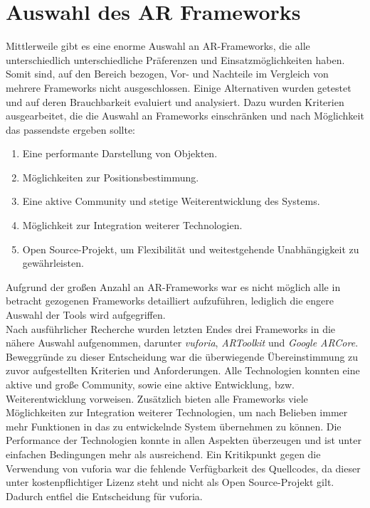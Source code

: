 \section{Auswahl des AR Frameworks}
\label{chap:Auswahl des AR Frameworks}
Mittlerweile gibt es eine enorme Auswahl an \acs{AR}-Frameworks, die alle unterschiedlich unterschiedliche Präferenzen und 
Einsatzmöglichkeiten haben. Somit sind, auf den Bereich bezogen, Vor- und Nachteile im Vergleich von mehrere Frameworks nicht ausgeschlossen. 
Einige Alternativen wurden getestet und auf deren Brauchbarkeit evaluiert und analysiert. Dazu wurden Kriterien ausgearbeitet, die die 
Auswahl an Frameworks einschränken und nach Möglichkeit das passendste ergeben sollte: 
\begin{enumerate}
    \item Eine performante Darstellung von Objekten.
    \item Möglichkeiten zur Positionsbestimmung.
    \item Eine aktive Community und stetige Weiterentwicklung des Systems.
    \item Möglichkeit zur Integration weiterer Technologien.
    \item Open Source-Projekt, um Flexibilität und weitestgehende Unabhängigkeit zu gewährleisten.
\end{enumerate}
Aufgrund der großen Anzahl an \acs{AR}-Frameworks war es nicht möglich alle in betracht gezogenen Frameworks detailliert aufzuführen, 
lediglich die engere Auswahl der Tools wird aufgegriffen. 
\\ 
Nach ausführlicher Recherche wurden letzten Endes drei Frameworks in die nähere Auswahl aufgenommen, darunter \textit{vuforia}, 
\textit{ARToolkit} und \textit{Google ARCore}. Beweggründe zu dieser Entscheidung war die überwiegende 
Übereinstimmung zu zuvor aufgestellten Kriterien und Anforderungen. Alle Technologien konnten eine aktive und große Community, sowie eine 
aktive Entwicklung, bzw. Weiterentwicklung vorweisen. Zusätzlich bieten alle Frameworks viele Möglichkeiten zur Integration weiterer 
Technologien, um nach Belieben immer mehr Funktionen in das zu entwickelnde System übernehmen zu können. Die Performance der Technologien konnte 
in allen Aspekten überzeugen und ist unter einfachen Bedingungen mehr als ausreichend. Ein Kritikpunkt gegen die Verwendung von vuforia war 
die fehlende Verfügbarkeit des Quellcodes, da dieser unter kostenpflichtiger Lizenz steht und nicht als Open Source-Projekt gilt. Dadurch 
entfiel die Entscheidung für vuforia.
